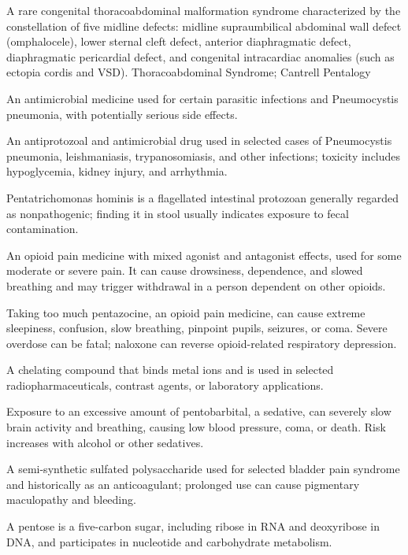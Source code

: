  A rare congenital thoracoabdominal malformation syndrome characterized by the constellation of five midline defects: midline supraumbilical abdominal wall defect (omphalocele), lower sternal cleft defect, anterior diaphragmatic defect, diaphragmatic pericardial defect, and congenital intracardiac anomalies (such as ectopia cordis and VSD).
\synonyms
Thoracoabdominal Syndrome; Cantrell Pentalogy

 An antimicrobial medicine used for certain parasitic infections and Pneumocystis pneumonia, with potentially serious side effects.

 An antiprotozoal and antimicrobial drug used in selected cases of Pneumocystis pneumonia, leishmaniasis, trypanosomiasis, and other infections; toxicity includes hypoglycemia, kidney injury, and arrhythmia.

 Pentatrichomonas hominis is a flagellated intestinal protozoan generally regarded as nonpathogenic; finding it in stool usually indicates exposure to fecal contamination.

 An opioid pain medicine with mixed agonist and antagonist effects, used for some moderate or severe pain. It can cause drowsiness, dependence, and slowed breathing and may trigger withdrawal in a person dependent on other opioids.

 Taking too much pentazocine, an opioid pain medicine, can cause extreme sleepiness, confusion, slow breathing, pinpoint pupils, seizures, or coma. Severe overdose can be fatal; naloxone can reverse opioid-related respiratory depression.

 A chelating compound that binds metal ions and is used in selected radiopharmaceuticals, contrast agents, or laboratory applications.

 Exposure to an excessive amount of pentobarbital, a sedative, can severely slow brain activity and breathing, causing low blood pressure, coma, or death. Risk increases with alcohol or other sedatives.

 A semi-synthetic sulfated polysaccharide used for selected bladder pain syndrome and historically as an anticoagulant; prolonged use can cause pigmentary maculopathy and bleeding.

 A pentose is a five-carbon sugar, including ribose in RNA and deoxyribose in DNA, and participates in nucleotide and carbohydrate metabolism.

